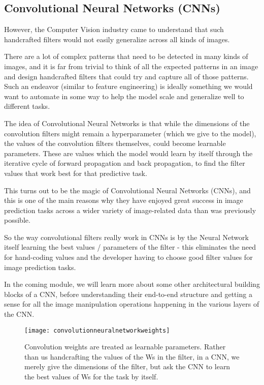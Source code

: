 	\subsection{Convolutional Neural Networks (CNNs)}
	\begin{bulletedlist}
		\item However, the Computer Vision industry came to understand that such handcrafted filters would not easily generalize across all kinds of images.
		\item There are a lot of complex patterns that need to be detected in many kinds of images, and it is far from trivial to think of all the expected patterns in an image and design handcrafted filters that could try and capture all of those patterns. Such an endeavor (similar to feature engineering) is ideally something we would want to automate in some way to help the model scale and generalize well to different tasks.
		\item The idea of Convolutional Neural Networks is that while the dimensions of the convolution filters might remain a hyperparameter (which we give to the model), the values of the convolution filters themselves, could become learnable parameters. These are values which the model would learn by itself through the iterative cycle of forward propagation and back propagation, to find the filter values that work best for that predictive task.
		\item This turns out to be the magic of Convolutional Neural Networks (CNNs), and this is one of the main reasons why they have enjoyed great success in image prediction tasks across a wider variety of image-related data than was previously possible.
		\item So the way convolutional filters really work in CNNs is by the Neural Network itself learning the best values / parameters of the filter - this eliminates the need for hand-coding values and the developer having to choose good filter values for image prediction tasks.
		\item In the coming module, we will learn more about some other architectural building blocks of a CNN, before understanding their end-to-end structure and getting a sense for all the image manipulation operations happening in the various layers of the CNN.
	\end{bulletedlist}

	\begin{figure}[h]
		\centering
		\texttt{[image: convolutionneuralnetworkweights]}
		\caption[Convolution weights are treated as learnable parameters]{Convolution weights are treated as learnable parameters.  Rather than us handcrafting the values of the Ws in the filter, in a CNN, we merely give the dimensions of the filter, but ask the CNN to learn the best values of Ws for the task by itself.}
		\label{fig:convolutionneuralnetworkweights}
	\end{figure}


